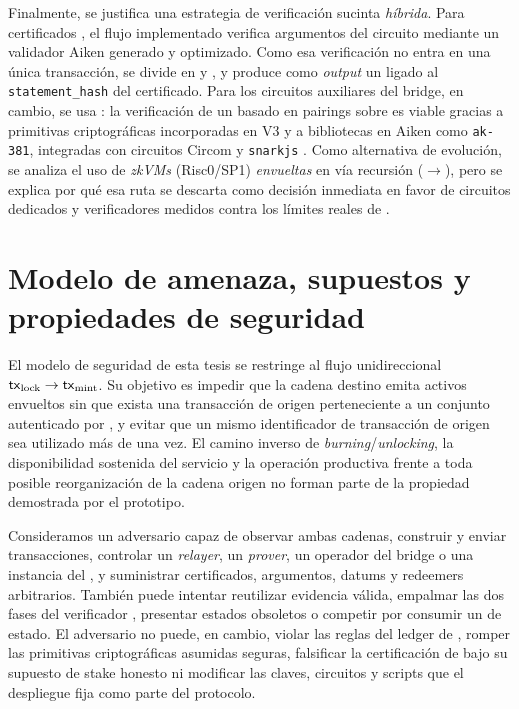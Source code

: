 Finalmente, se justifica una estrategia de verificación sucinta \emph{híbrida}. Para certificados \Mithril, el flujo implementado verifica \Onchain argumentos \HaloTwo del circuito \MidnightSTMCircuit mediante un validador Aiken generado y optimizado. Como esa verificación no entra en una única transacción, se divide en \PhaseOneSetupTx y \PhaseTwoVerifyTx, y produce como \textit{output} un \ProofReceipt ligado al \texttt{statement\_hash} del certificado. Para los circuitos auxiliares del bridge, en cambio, se usa \Groth: la verificación de un \SNARK basado en pairings sobre \BLS es viable gracias a primitivas criptográficas incorporadas en \Plutus V3 y a bibliotecas en Aiken como \texttt{ak-381}, integradas con circuitos Circom y \texttt{snarkjs} \cite{CIP0381, IOGPlutusV3, AK381Repo}. Como alternativa de evolución, se analiza el uso de \textit{zkVMs} (Risc0/SP1) \emph{envueltas} en \Groth vía recursión (\STARK$\rightarrow$\SNARK), pero se explica por qué esa ruta se descarta como decisión inmediata en favor de circuitos dedicados y verificadores medidos contra los límites reales de \Cardano \cite{Risc0Recursion, SP1TestnetLaunch, EryxProofOfInnocenceSurvey, CardanoCourseProtocolParams}.

\section{Modelo de amenaza, supuestos y propiedades de seguridad}
\label{sec:design-decisions-modelo-de-seguridad}

El modelo de seguridad de esta tesis se restringe al flujo unidireccional $\mathsf{tx}_{\mathrm{lock}} \rightarrow \mathsf{tx}_{\mathrm{mint}}$. Su objetivo es impedir que la cadena destino emita activos envueltos sin que exista una transacción de origen perteneciente a un conjunto autenticado por \Mithril, y evitar que un mismo identificador de transacción de origen sea utilizado más de una vez. El camino inverso de \textit{burning}/\textit{unlocking}, la disponibilidad sostenida del servicio y la operación productiva frente a toda posible reorganización de la cadena origen no forman parte de la propiedad demostrada por el prototipo.

Consideramos un adversario capaz de observar ambas cadenas, construir y enviar transacciones, controlar un \textit{relayer}, un \textit{prover}, un operador del bridge o una instancia del \MithrilAggregator, y suministrar certificados, argumentos, datums y redeemers arbitrarios. También puede intentar reutilizar evidencia válida, empalmar las dos fases del verificador \STM, presentar estados obsoletos o competir por consumir un \UTxO de estado. El adversario no puede, en cambio, violar las reglas del ledger de \Cardano, romper las primitivas criptográficas asumidas seguras, falsificar la certificación de \Mithril bajo su supuesto de stake honesto ni modificar las claves, circuitos y scripts que el despliegue fija como parte del protocolo.

